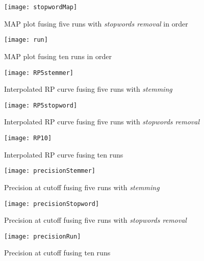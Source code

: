 \documentclass[letterpaper, 10 pt, conference]{ieeeconf}  %
\begin{document}
\begin{figure}[!htbp]
\centering
\texttt{[image: stopwordMap]}
\caption{MAP plot fusing five runs with \textit{stopwords removal} in order}
\label{FIG:Combining five runs with stopwords removal in order}
\end{figure}

\begin{figure}[!htbp]
\centering
\texttt{[image: run]}
\caption{MAP plot fusing ten runs in order}
\label{FIG:Combining ten runs in order}
\end{figure}

\begin{figure}[!htbp]
\centering
\texttt{[image: RP5stemmer]}
\caption{Interpolated RP curve fusing five runs with \textit{stemming}}
\label{FIG:Combining five runs with stemming in order}
\end{figure}

\begin{figure}[!htbp]
\centering
\texttt{[image: RP5stopword]}
\caption{Interpolated RP curve fusing five runs with \textit{stopwords removal}}
\label{FIG:Combining five runs with stopwords removal in order}
\end{figure}

\begin{figure}[!htbp]
\centering
\texttt{[image: RP10]}
\caption{Interpolated RP curve fusing ten runs}
\label{FIG:Combining ten runs in order}
\end{figure}

\begin{figure}[!htbp]
\centering
\texttt{[image: precisionStemmer]}
\caption{Precision at cutoff fusing five runs with \textit{stemming}}
\label{FIG:Combining five runs with stemming in order}
\end{figure}

\begin{figure}[!htbp]
\centering
\texttt{[image: precisionStopword]}
\caption{Precision at cutoff fusing five runs with \textit{stopwords removal}}
\label{FIG:Combining five runs with stopwords removal in order}
\end{figure}

\begin{figure}[!htbp]
\centering
\texttt{[image: precisionRun]}
\caption{Precision at cutoff fusing ten runs}
\label{FIG:Combining ten runs in order}
\end{figure}
\end{document}
